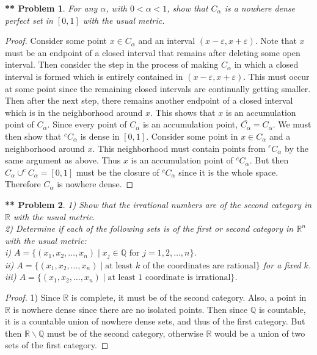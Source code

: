 \documentclass{article}
\newtheorem{**}{** Problem}
\begin{document}
\begin{flushleft}
\begin{**}
For any $\alpha$, with $0 < \alpha < 1$, show that $C_{\alpha}$ is a nowhere dense perfect set in $[0,1]$ with the usual metric.
\end{**}
\begin{proof}
Consider some point $x \in C_{\alpha}$ and an interval $(x - \varepsilon, x + \varepsilon)$. Note that $x$ must be an endpoint of a closed interval that remains after deleting some open interval. Then consider the step in the process of making $C_{\alpha}$ in which a closed interval is formed which is entirely contained in $(x - \varepsilon, x + \varepsilon)$. This must occur at some point since the remaining closed intervals are continually getting smaller. Then after the next step, there remains another endpoint of a closed interval which is in the neighborhood around $x$. This shows that $x$ is an accumulation point of $C_{\alpha}$. Since every point of $C_{\alpha}$ is an accumulation point, $\overline{C_{\alpha}} = C_{\alpha}$. We must then show that $^c C_{\alpha}$ is dense in $[0,1]$. Consider some point in $x \in C_{\alpha}$ and a neighborhood around $x$. This neighborhood must contain points from $^c C_{\alpha}$ by the same argument as above. Thus $x$ is an accumulation point of $^c C_{\alpha}$. But then $C_{\alpha} \cup ^c C_{\alpha} = [0,1]$ must be the closure of $^c C_{\alpha}$ since it is the whole space. Therefore $C_{\alpha}$ is nowhere dense.
\end{proof}

\begin{**}
1) Show that the irrational numbers are of the second category in $\mathbb{R}$ with the usual metric.\\
2) Determine if each of the following sets is of the first or second category in $\mathbb{R}^n$ with the usual metric:\\
i) $A = \{(x_1, x_2, \dots , x_n) \mid \text{$x_j \in \mathbb{Q}$ for $j = 1, 2, \dots , n$}\}$.\\
ii) $A = \{(x_1, x_2, \dots , x_n) \mid \text{at least $k$ of the coordinates are rational}\}$ for a fixed $k$.\\
iii) $A = \{(x_1, x_2, \dots , x_n) \mid \text{at least $1$ coordinate is irrational}\}$.
\end{**}
\begin{proof}
1) Since $\mathbb{R}$ is complete, it must be of the second category. Also, a point in $\mathbb{R}$ is nowhere dense since there are no isolated points. Then since $\mathbb{Q}$ is countable, it is a countable union of nowhere dense sets, and thus of the first category. But then $\mathbb{R} \backslash \mathbb{Q}$ must be of the second category, otherwise $\mathbb{R}$ would be a union of two sets of the first category.\newline


\end{proof}
\end{flushleft}
\end{document}
